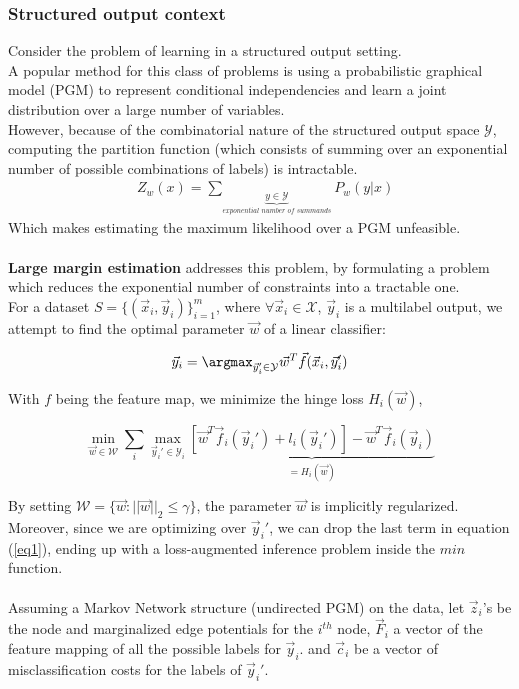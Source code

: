 \documentclass{article}
\begin{document}
\subsubsection{Structured output context}
Consider the problem of learning in a structured output setting.\\ 
A popular method for this class of problems is using a probabilistic graphical model (PGM) to represent conditional independencies and learn a joint distribution over a large number of variables.\\
However, because of the combinatorial nature of the structured output space $\mathcal{Y}$, computing the partition function (which consists of summing over an exponential number of possible combinations of labels) is intractable. 
\begin{equation*}
\begin{aligned}
    &Z_{w}(x)= \sum_{\underbrace{y\in\mathcal{Y}}_{\textit{exponential number of summands}}}P_{w}(y|x)
\end{aligned}
\end{equation*}
Which makes estimating the maximum likelihood over a PGM unfeasible.\\
\\
\textbf{Large margin estimation} addresses this problem, by formulating a problem which reduces the exponential number of constraints into a tractable one.\\
For a dataset $ S = \{ (\vec x_i, \vec y_i) \}_{i=1}^{m} $,
where $\forall \vec x_i\in \mathcal{X}$,  $\vec y_i$ is a multilabel output, we attempt to find the optimal parameter $\vec w$ of a linear classifier:

\begin{equation}
  \vec y_i = \argmax_{\vec y_i' \in \mathcal{Y}} \vec w^T \vec f(\vec x_i,\vec y_i')
  \label{eq1}
\end{equation}

With $f$ being the feature map, we minimize the hinge loss $H_{i}(\vec w)$,

\begin{equation}
  \min_{\vec w \in \mathcal{W}} \sum_i \max_{\vec y_i' \in \mathcal{Y}_i} \underbrace{\left[
\vec w^T \vec f_i(\vec y_i') + l_i(\vec y_i') \right] - \vec w^T \vec f_i(\vec
y_i)}_{=H_{i}(\vec w)}
\end{equation}

By setting $\mathcal{W}=\{\vec w: ||\vec w||_{2}\leq \gamma\}$, the parameter $\vec w$ is implicitly regularized. Moreover, since we are
optimizing over $\vec y_i'$, we can drop the last term in equation (\ref{eq1}), ending
up with a loss-augmented inference problem inside the $min$ function.\\
\\
Assuming a Markov Network structure (undirected PGM) on the data, let $\vec z_i$'s be the node and marginalized edge potentials for the $i^{th}$ node, $\vec F_i$ a vector of the feature mapping of all the possible labels for $\vec y_i$. and $\vec c_i$ be a vector of misclassification costs for the labels of $\vec y_i'$.
\end{document}
